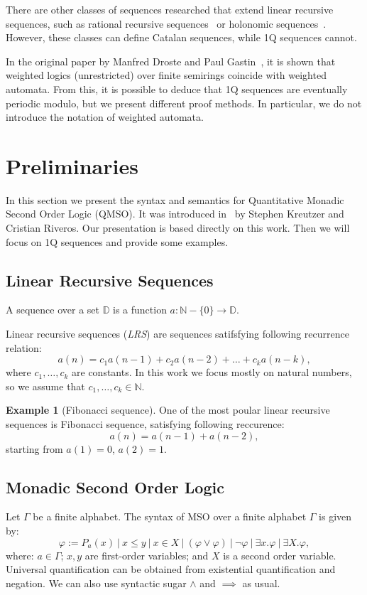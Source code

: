 \documentclass[12pt]{article}
\theoremstyle{definition}
\newtheorem{example}{Example}[section]
\begin{document}
There are other classes of sequences researched that extend linear recursive sequences, such as rational recursive sequences~\cite{ClementeDMP23} or holonomic sequences~\cite{KenisonKLLMOW021}. However, these classes can define Catalan sequences, while 1Q sequences cannot.

In the original paper by Manfred Droste and Paul Gastin~\cite{DrosteG07}, it is shown that weighted logics (unrestricted) over finite semirings coincide with weighted automata. From this, it is possible to deduce that 1Q sequences are eventually periodic modulo, but we present different proof methods. In particular, we do not introduce the notation of weighted automata.

\section{Preliminaries}
In this section we present the syntax and semantics for Quantitative Monadic Second Order Logic (QMSO). It was introduced in~\cite{KreutzerR13} by Stephen Kreutzer and Cristian Riveros. Our presentation is based directly on this work. Then we will focus on 1Q sequences and provide some examples.

\subsection{Linear Recursive Sequences}
A sequence over a set $\mathbb{D}$ is a function $a : \mathbb{N} - \{0\} \rightarrow \mathbb{D}$.

Linear recursive sequences (\emph{LRS}) are sequences satifsfying following recurrence relation:
$$a(n) = c_1 a(n-1) + c_2 a(n-2) + \ldots + c_k a(n-k),$$
where $c_1,\ldots,c_k$ are constants. In this work we focus mostly on natural numbers, so we assume that $c_1,\ldots ,c_k \in \mathbb{N}$.

\begin{example}[Fibonacci sequence]
    One of the most poular linear recursive sequences is Fibonacci sequence, satisfying following reccurence:
    $$a(n) = a(n-1) + a(n-2),$$
    starting from $a(1) = 0$, $a(2) = 1$.
\end{example}

\subsection{Monadic Second Order Logic}

Let $\Gamma$ be a finite alphabet. The syntax of MSO over a finite alphabet $\Gamma$ is given by:
$$ \varphi := P_a(x) \ | \ x \leq y \ | \ x \in X \ | \ (\varphi \lor \varphi) \ | \ \neg \varphi \ | \ \exists x. \varphi \ | \ \exists X . \varphi, $$
where: $a \in \Gamma$; $x, y$ are first-order variables; and $X$ is a second order variable. Universal quantification can be obtained from existential quantification and negation. We can also use syntactic sugar $\land$ and $\implies$ as usual.
\end{document}
